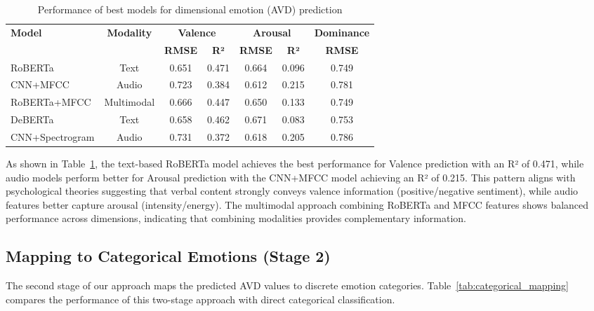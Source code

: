 \documentclass[12pt]{article}
\begin{document}
\begin{table}[h]
\centering
\caption{Performance of best models for dimensional emotion (AVD) prediction}
\label{tab:avd_prediction}
\begin{tabular}{|l|c|c|c|c|c|c|}
\hline
\textbf{Model} & \textbf{Modality} & \multicolumn{2}{c|}{\textbf{Valence}} & \multicolumn{2}{c|}{\textbf{Arousal}} & \textbf{Dominance} \\
\cline{3-7}
 & & \textbf{RMSE} & \textbf{R²} & \textbf{RMSE} & \textbf{R²} & \textbf{RMSE} \\
\hline
RoBERTa & Text & 0.651 & 0.471 & 0.664 & 0.096 & 0.749 \\
\hline
CNN+MFCC & Audio & 0.723 & 0.384 & 0.612 & 0.215 & 0.781 \\
\hline
RoBERTa+MFCC & Multimodal & 0.666 & 0.447 & 0.650 & 0.133 & 0.749 \\
\hline
DeBERTa & Text & 0.658 & 0.462 & 0.671 & 0.083 & 0.753 \\
\hline
CNN+Spectrogram & Audio & 0.731 & 0.372 & 0.618 & 0.205 & 0.786 \\
\hline
\end{tabular}
\end{table}

As shown in Table~\ref{tab:avd_prediction}, the text-based RoBERTa model achieves the best performance for Valence prediction with an R² of 0.471, while audio models perform better for Arousal prediction with the CNN+MFCC model achieving an R² of 0.215. This pattern aligns with psychological theories suggesting that verbal content strongly conveys valence information (positive/negative sentiment), while audio features better capture arousal (intensity/energy). The multimodal approach combining RoBERTa and MFCC features shows balanced performance across dimensions, indicating that combining modalities provides complementary information.

\subsection{Mapping to Categorical Emotions (Stage 2)}

The second stage of our approach maps the predicted AVD values to discrete emotion categories. Table~\ref{tab:categorical_mapping} compares the performance of this two-stage approach with direct categorical classification.
\end{document}
